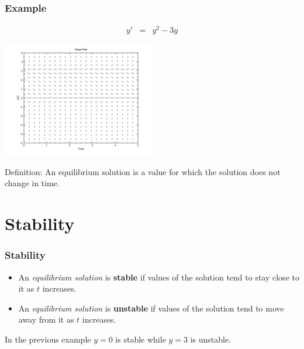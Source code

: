 \begin{frame}
  \frametitle{Example}

  \vspace*{-4em}

  \begin{eqnarray*}
    y' & = & y^2 - 3y
  \end{eqnarray*}

  \includegraphics[height=5cm]{week1Day2SlopeField3}

  Definition: An equilibrium solution is a value for which the
  solution does not change in time.


\end{frame}

\section{Stability}

\begin{frame}
  \frametitle{Stability}

  \begin{itemize}
  \item An \textit{equilibrium solution} is \textbf{stable} if values
    of the solution tend to stay close to it as $t$ increases.
  \item An \textit{equilibrium solution} is \textbf{unstable} if
    values of the solution tend to move away from it as $t$ increases.
  \end{itemize}

  In the previous example $y=0$ is stable while $y=3$ is unstable.

\end{frame}



